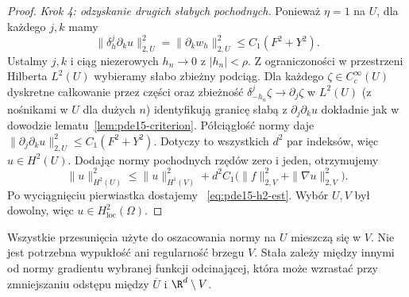 \begin{proof}
\emph{Krok 4: odzyskanie drugich słabych pochodnych.}
Ponieważ $\eta=1$ na $U$, dla każdego $j,k$ mamy
\[
 \|\delta_h^j\partial_ku\|_{2,U}^2
 =\|\partial_kw_h\|_{2,U}^2\le C_1(F^2+Y^2).
\]
Ustalmy $j,k$ i ciąg niezerowych $h_n\to0$ z $|h_n|<\rho$.
Z ograniczoności w przestrzeni Hilberta $L^2(U)$
wybieramy słabo zbieżny podciąg. Dla każdego
$\zeta\in C_c^\infty(U)$ dyskretne całkowanie przez części
oraz zbieżność $\delta_{-h_n}^j\zeta\to\partial_j\zeta$
w $L^2(U)$ (z nośnikami w $U$ dla dużych $n$)
identyfikują granicę słabą z $\partial_j\partial_ku$
dokładnie jak w dowodzie lematu~\ref{lem:pde15-criterion}.
Półciągłość normy daje
$\|\partial_j\partial_ku\|_{2,U}^2\le C_1(F^2+Y^2)$.
Dotyczy to wszystkich $d^2$ par indeksów, więc $u\in H^2(U)$.
Dodając normy pochodnych rzędów zero i jeden, otrzymujemy
\[
 \|u\|_{H^2(U)}^2
 \le\|u\|_{H^1(V)}^2+d^2C_1
       \bigl(\|f\|_{2,V}^2+\|\nabla u\|_{2,V}^2\bigr).
\]
Po wyciągnięciu pierwiastka dostajemy
~\eqref{eq:pde15-h2-est}. Wybór $U,V$ był dowolny,
więc $u\in H^2_{\mathrm{loc}}(\Omega)$.
\end{proof}

\begin{uwaga}
Wszystkie przesunięcia użyte do oszacowania normy
na $U$ mieszczą się w $V$. Nie jest potrzebna wypukłość
ani regularność brzegu $V$. Stała zależy między innymi
od normy gradientu wybranej funkcji odcinającej,
która może wzrastać przy zmniejszaniu odstępu
między $\overline U$ i $\R^d\setminus V$.
\end{uwaga}

